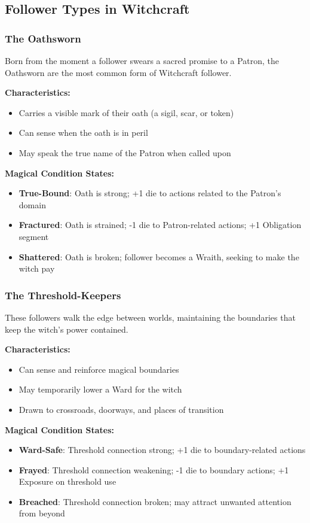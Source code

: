\subsection{Follower Types in Witchcraft}

\subsubsection{The Oathsworn}
Born from the moment a follower swears a sacred promise to a Patron, the Oathsworn are the most common form of Witchcraft follower.

\textbf{Characteristics:}
\begin{itemize}
    \item Carries a visible mark of their oath (a sigil, scar, or token)
    \item Can sense when the oath is in peril
    \item May speak the true name of the Patron when called upon
\end{itemize}

\textbf{Magical Condition States:}
\begin{itemize}
    \item \textbf{True-Bound}: Oath is strong; +1 die to actions related to the Patron's domain
    \item \textbf{Fractured}: Oath is strained; -1 die to Patron-related actions; +1 Obligation segment
    \item \textbf{Shattered}: Oath is broken; follower becomes a Wraith, seeking to make the witch pay
\end{itemize}

\subsubsection{The Threshold-Keepers}
These followers walk the edge between worlds, maintaining the boundaries that keep the witch's power contained.

\textbf{Characteristics:}
\begin{itemize}
    \item Can sense and reinforce magical boundaries
    \item May temporarily lower a Ward for the witch
    \item Drawn to crossroads, doorways, and places of transition
\end{itemize}

\textbf{Magical Condition States:}
\begin{itemize}
    \item \textbf{Ward-Safe}: Threshold connection strong; +1 die to boundary-related actions
    \item \textbf{Frayed}: Threshold connection weakening; -1 die to boundary actions; +1 Exposure on threshold use
    \item \textbf{Breached}: Threshold connection broken; may attract unwanted attention from beyond
\end{itemize}

